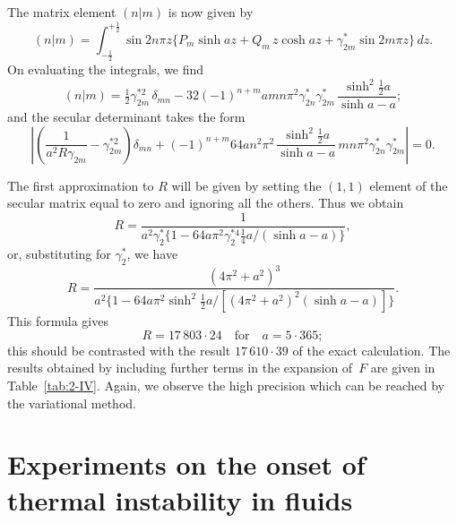 The matrix element $(n|m)$ is now given by
\begin{equation}
\label{eq:2-317}
(n|m) = \int_{-\frac{1}{2}}^{+\frac{1}{2}} \sin 2n\pi z\{P_m \sinh az + Q_m\,z\cosh az + \gamma_{2m}^*\sin 2m\pi z\}\,dz.
\end{equation}
On evaluating the integrals, we find
\begin{equation}
\label{eq:2-318}
(n|m) = \tfrac{1}{2}\gamma_{2m}^{*2}\,\delta_{mn} - 32(-1)^{n+m} amn\pi^2 \gamma_{2n}^*\gamma_{2m}^*\,\frac{\sinh^2\!\tfrac{1}{2}a}{\sinh a - a};
\end{equation}
and the secular determinant takes the form
\begin{equation}
\label{eq:2-319}
\left|\left(\frac{1}{a^2 R\gamma_{2m}} - \gamma_{2m}^{*2}\right)\delta_{mn} + (-1)^{n+m} 64an^2\pi^2\,\frac{\sinh^2\!\tfrac{1}{2}a}{\sinh a - a}\,mn\pi^2\gamma_{2n}^*\gamma_{2m}^*\right| = 0.
\end{equation}

The first approximation to $R$ will be given by setting the $(1,1)$ element
of the secular matrix equal to zero and ignoring all the others. Thus
we obtain
\begin{equation}
\label{eq:2-320}
R = \frac{1}{a^2\gamma_2^{*}\{1 - 64a\pi^2\gamma_2^{*4}\tfrac{1}{4}a/(\sinh a - a)\}},
\end{equation}
or, substituting for $\gamma_{2}^*$, we have
\begin{equation}
\label{eq:2-321}
R = \frac{(4\pi^2+a^2)^3}{a^2\{1 - 64a\pi^2\sinh^2\!\tfrac{1}{2}a/[(4\pi^2+a^2)^2(\sinh a - a)]\}}.
\end{equation}
This formula gives
\begin{equation}
\label{eq:2-322}
R = 17\,803{\cdot}24 \quad\text{for}\quad a = 5{\cdot}365;
\end{equation}
this should be contrasted with the result $17\,610{\cdot}39$ of the exact calculation.
The results obtained by including further terms in the expansion
of~$F$ are given in Table~\ref{tab:2-IV}. Again, we observe the high precision which
can be reached by the variational method.


\section{Experiments on the onset of thermal instability in fluids}\label{sec:18}

